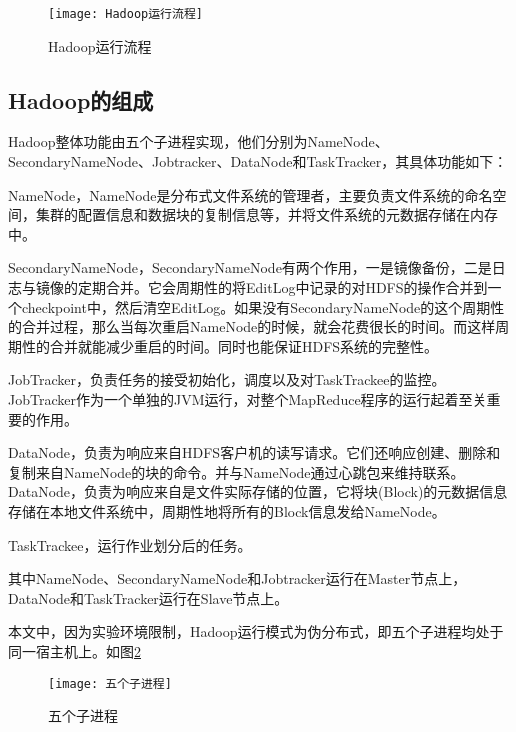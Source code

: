 \begin{figure}
 \centering
 \texttt{[image: Hadoop运行流程]}
 \caption{Hadoop运行流程}
 \label{fig:Hadoop运行流程}
\end{figure}

\subsection{Hadoop的组成}
Hadoop整体功能由五个子进程实现，他们分别为NameNode、SecondaryNameNode、Jobtracker、DataNode和TaskTracker，其具体功能如下：

NameNode，NameNode是分布式文件系统的管理者，主要负责文件系统的命名空间，集群的配置信息和数据块的复制信息等，并将文件系统的元数据存储在内存中。

SecondaryNameNode，SecondaryNameNode有两个作用，一是镜像备份，二是日志与镜像的定期合并。它会周期性的将EditLog中记录的对HDFS的操作合并到一个checkpoint中，然后清空EditLog。如果没有SecondaryNameNode的这个周期性的合并过程，那么当每次重启NameNode的时候，就会花费很长的时间。而这样周期性的合并就能减少重启的时间。同时也能保证HDFS系统的完整性。

JobTracker，负责任务的接受初始化，调度以及对TaskTrackee的监控。JobTracker作为一个单独的JVM运行，对整个MapReduce程序的运行起着至关重要的作用。

DataNode，负责为响应来自HDFS客户机的读写请求。它们还响应创建、删除和复制来自NameNode的块的命令。并与NameNode通过心跳包来维持联系。DataNode，负责为响应来自是文件实际存储的位置，它将块(Block)的元数据信息存储在本地文件系统中，周期性地将所有的Block信息发给NameNode。

TaskTrackee，运行作业划分后的任务。

其中NameNode、SecondaryNameNode和Jobtracker运行在Master节点上，DataNode和TaskTracker运行在Slave节点上。

本文中，因为实验环境限制，Hadoop运行模式为伪分布式，即五个子进程均处于同一宿主机上。如图\ref{fig:五个子进程}

\begin{figure}[h]
 \centering
 \texttt{[image: 五个子进程]}
 \caption{五个子进程}
 \label{fig:五个子进程}
\end{figure}


